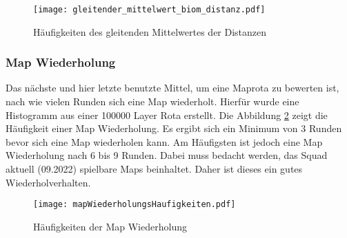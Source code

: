             \begin{figure}[htbp]
                \centering
                \texttt{[image: gleitender\_mittelwert\_biom\_distanz.pdf]}
                \caption{Häufigkeiten des gleitenden Mittelwertes der Distanzen}
                \label{fig:haufigkeit_gleitender_mittelwert}
            \end{figure}
            

        \subsubsection{Map Wiederholung}
            Das nächste und hier letzte benutzte Mittel, um eine Maprota zu bewerten ist, nach wie vielen Runden sich eine Map
            wiederholt. Hierfür wurde eine Histogramm aus einer 100000 Layer Rota erstellt.
            Die Abbildung \ref{fig:haufigkeit_der_map_wiederholung} zeigt die Häufigkeit einer Map Wiederholung. Es ergibt sich ein
            Minimum von 3 Runden bevor sich eine Map wiederholen kann. Am Häufigsten ist jedoch eine Map Wiederholung nach 6 bis 9 Runden.
            Dabei muss bedacht werden, das Squad aktuell (09.2022) spielbare Maps beinhaltet. Daher ist dieses ein gutes Wiederholverhalten.

            \begin{figure}[htbp]
                \centering
                \texttt{[image: mapWiederholungsHaufigkeiten.pdf]}
                \caption{Häufigkeiten der Map Wiederholung}
                \label{fig:haufigkeit_der_map_wiederholung}
            \end{figure}

